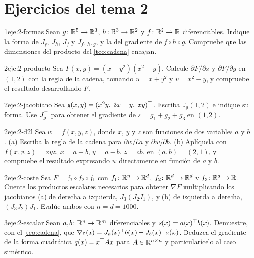 \section*{Ejercicios del tema 2}

\begin{ejercicio}{1}{eje:2-formas}
Sean $g\colon\mathbb{R}^{5}\to\mathbb{R}^{3}$, $h\colon\mathbb{R}^{3}\to\mathbb{R}^{2}$ y $f\colon\mathbb{R}^{2}\to\mathbb{R}$ diferenciables. Indique la forma de $J_g$, $J_h$, $J_f$ y $J_{f\circ h\circ g}$, y la del gradiente de $f\circ h\circ g$. Compruebe que las dimensiones del producto del \cref{teo:cadena} encajan.
\end{ejercicio}

\begin{ejercicio}{2}{eje:2-producto}
Sea $F(x,y)=(x+y^{2})(x^{2}-y)$. Calcule $\partial F/\partial x$ y $\partial F/\partial y$ en $(1,2)$ con la regla de la cadena, tomando $u=x+y^{2}$ y $v=x^{2}-y$, y compruebe el resultado desarrollando $F$.
\end{ejercicio}

\begin{ejercicio}{2}{eje:2-jacobiano}
Sea $g(x,y)=(x^{2}y,\;3x-y,\;xy)^{\top}$. Escriba $J_g(1,2)$ e indique su forma. Use $J_g^{\top}$ para obtener el gradiente de $s=g_1+g_2+g_3$ en $(1,2)$.
\end{ejercicio}

\begin{ejercicio}{2}{eje:2-d2l}
Sea $w=f(x,y,z)$, donde $x$, $y$ y $z$ son funciones de dos variables $a$ y $b$. (a) Escriba la regla de la cadena para $\partial w/\partial a$ y $\partial w/\partial b$. (b) Aplíquela con $f(x,y,z)=xyz$, $x=a+b$, $y=a-b$, $z=ab$, en $(a,b)=(2,1)$, y compruebe el resultado expresando $w$ directamente en función de $a$ y $b$.
\end{ejercicio}

\begin{ejercicio}{2}{eje:2-coste}
Sea $F=f_3\circ f_2\circ f_1$ con $f_1\colon\mathbb{R}^{n}\to\mathbb{R}^{d}$, $f_2\colon\mathbb{R}^{d}\to\mathbb{R}^{d}$ y $f_3\colon\mathbb{R}^{d}\to\mathbb{R}$. Cuente los productos escalares necesarios para obtener $\nabla F$ multiplicando los jacobianos (a) de derecha a izquierda, $J_3(J_2J_1)$, y (b) de izquierda a derecha, $(J_3J_2)J_1$. Evalúe ambos con $n=d=1000$.
\end{ejercicio}

\begin{ejercicio}{3}{eje:2-escalar}
Sean $a,b\colon\mathbb{R}^{n}\to\mathbb{R}^{m}$ diferenciables y $s(x)=a(x)^{\top} b(x)$. Demuestre, con el \cref{teo:cadena}, que $\nabla s(x)=J_a(x)^{\top} b(x)+J_b(x)^{\top} a(x)$. Deduzca el gradiente de la forma cuadrática $q(x)=x^{\top} Ax$ para $A\in\mathbb{R}^{n\times n}$ y particularícelo al caso simétrico.
\end{ejercicio}

